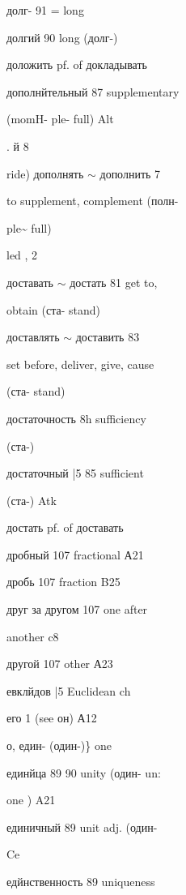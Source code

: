 \begin{minipage}[t]{0.475\textwidth}
\raggedright
\noindent долг- 91 = long\par
\noindent долгий 90 long (долг-)\par
\noindent доложить pf. of докладывать\par
\noindent дополнйтельный 87 supplementary\par
\noindent (momH- ple- full) Alt\par
{} . й 8\par
\noindent ride) дополнять $\sim$ дополнить 7\par
\noindent to supplement, complement (полн-\par
\noindent ple\textasciitilde{} full)\par
\noindent led , 2\par
\noindent доставать $\sim$ достать 81 get to,\par
\noindent obtain (ста- stand)\par
\noindent доставлять $\sim$ доставить 83\par
\noindent set before, deliver, give, cause\par
\noindent (ста- stand)\par
\noindent достаточность 8h sufficiency\par
\noindent (ста-)\par
\noindent достаточный |5 85 sufficient\par
\noindent (ста-) Atk\par
\noindent достать pf. of доставать\par
\noindent дробный 107 fractional А21\par
\noindent дробь 107 fraction B25\par
\noindent друг за другом 107 one after\par
\noindent another c8\par
{}\par
\noindent другой 107 other А23\par
\noindent евклйдов |5 Euclidean ch\par
\noindent его 1 (see он) А12\par
\noindent о, един- (один-)\} one\par
\noindent единйца 89 90 unity (один- un:\par
\noindent one ) A21\par
\noindent единичный 89 unit adj. (один-\par
\noindent Ce\par
\noindent едйнственность 89 uniqueness\par

\end{minipage}

